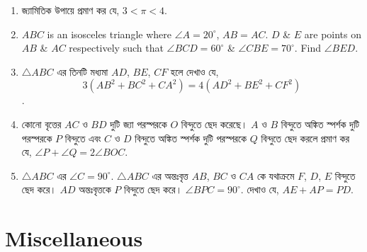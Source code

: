 \documentclass[11pt, a4paper]{article}
\begin{document}
\begin{enumerate}
	\item \textbengali{জ্যামিতিক উপায়ে প্রমাণ কর যে,} $3 < \pi < 4$.
	
	\item $ABC$ is an isosceles triangle where $\angle A = 20^{\circ}$, $AB = AC$. $D$ \& $E$ are points on $AB$ \& $AC$ respectively such that $\angle BCD = 60^{\circ}$ \& $\angle CBE = 70^{\circ}$. Find $\angle BED$.
	
	
	\item $\bigtriangleup ABC$ \textbengali{এর তিনটি মধ্যমা} $AD$, $BE$, $CF$ \textbengali{হলে দেখাও যে,} $$3(AB^2 + BC^2 + CA^2) = 4(AD^2 + BE^2 + CF^2)$$.
	
	\item \textbengali{কোনো বৃত্তের} $AC$ \textbengali{ও} $BD$ \textbengali{দুটি জ্যা পরস্পরকে} $O$ \textbengali{বিন্দুতে ছেদ করেছে।} $A$ \textbengali{ও} $B$ \textbengali{বিন্দুতে অঙ্কিত স্পর্শক দুটি পরস্পরকে} $P$ \textbengali{বিন্দুতে এবং} $C$ \textbengali{ও} $D$ \textbengali{বিন্দুতে অঙ্কিত স্পর্শক দুটি পরস্পরকে} $Q$ \textbengali{বিন্দুতে ছেদ করলে প্রমাণ কর যে,} $\angle P + \angle Q = 2 \angle BOC$.
	

	\item $\bigtriangleup ABC$ \textbengali{এর} $\angle C = 90^{\circ}$. $\bigtriangleup ABC$ \textbengali{এর অন্তঃবৃত্ত} $AB$, $BC$ \textbengali{ও} $CA$ \textbengali{কে যথাক্রমে} $F$, $D$, $E$ \textbengali{বিন্দুতে ছেদ করে।} $AD$ \textbengali{অন্তঃবৃত্তকে} $P$ \textbengali{বিন্দুতে ছেদ করে।} $\angle BPC = 90^{\circ}.$ \textbengali{দেখাও যে,} $AE + AP = PD$.
\end{enumerate}
		     
		  
		  
		  
		  
		  
		  
		  
		  
		  
		  
		  
		  
		  
		  
		  
		  
		  
		  
		  
		  
		  
		  
		  
		  
		  
		  
		     

\section{Miscellaneous}
\end{document}
